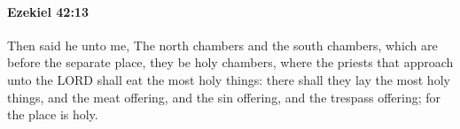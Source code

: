 
		\paragraph{Ezekiel 42:13} %
			\label{EZEKIEL-42-13}

			Then said he unto me, The north chambers and the south chambers, which are before the separate place, they be holy chambers, where the priests that approach unto the LORD shall eat the most holy things: there shall they lay the most holy things, and the meat offering, and the sin offering, and the trespass offering; for the place is holy.


